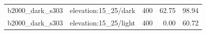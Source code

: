 \begin{longtable}{l>{\raggedright\arraybackslash}p{.42\linewidth}rrr}
b2000\_\allowbreak{}dark\_\allowbreak{}s303 & %
elevation:15\_\allowbreak{}25/dark & %
400 & %
62.75 & %
98.94 \\ %

b2000\_\allowbreak{}dark\_\allowbreak{}s303 & %
elevation:15\_\allowbreak{}25/light & %
400 & %
0.00 & %
60.72 \\ %


\end{longtable}
